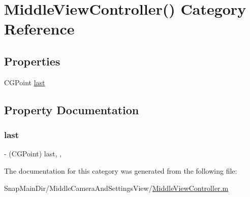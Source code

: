 \hypertarget{category_middle_view_controller_07_08}{}\section{Middle\+View\+Controller() Category Reference}
\label{category_middle_view_controller_07_08}
\subsection*{Properties}
\begin{DoxyCompactItemize}
\item 
C\+G\+Point \hyperlink{category_middle_view_controller_07_08_ab3a2c1877de2c7d272d3426524c73559}{last}
\end{DoxyCompactItemize}


\subsection{Property Documentation}
\hypertarget{category_middle_view_controller_07_08_ab3a2c1877de2c7d272d3426524c73559}{}\label{category_middle_view_controller_07_08_ab3a2c1877de2c7d272d3426524c73559} 
\subsubsection{\texorpdfstring{last}{last}}
{\footnotesize\ttfamily -\/ (C\+G\+Point) last\hspace{0.3cm}{\ttfamily [read]}, {\ttfamily [write]}, {\ttfamily [atomic]}}



The documentation for this category was generated from the following file\+:\begin{DoxyCompactItemize}
\item 
Snap\+Main\+Dir/\+Middle\+Camera\+And\+Settings\+View/\hyperlink{_middle_view_controller_8m}{Middle\+View\+Controller.\+m}\end{DoxyCompactItemize}
